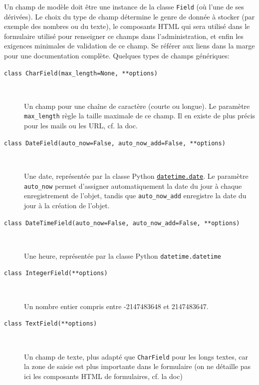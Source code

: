 \documentclass[a4paper, 10pt]{article}
\begin{document}
Un champ  de modèle doit être une instance de la classe \texttt{Field} (où l'une de ses dérivées). Le choix du type de champ détermine le genre de donnée à stocker (par exemple des nombres ou du texte), le composants HTML qui sera utilisé dans le formulaire utilisé pour renseigner ce champs dans l'administration, et enfin les exigences minimales de validation de ce champ. Se référer aux liens dans la marge pour une documentation complète. Quelques types de champs génériques:
\begin{description}
    \item[\texttt{class CharField(max_length=None, **options)}]~

          Un champ pour une chaîne de caractère (courte ou longue). Le paramètre \texttt{max_length} règle la taille maximale de ce champ. Il en existe de plus précis pour les mails ou les URL, cf. la doc.

    \item[\texttt{class DateField(auto_now=False, auto_now_add=False, **options)}]~

          Une date, représentée par la classe Python \hyperref[datetime]{\texttt{datetime.date}}. Le paramètre \texttt{auto_now} permet d'assigner automatiquement la date du jour à chaque enregistrement de l'objet, tandis que \texttt{auto_now_add} enregistre la date du jour à la création de l'objet.

    \item[\texttt{class DateTimeField(auto_now=False, auto_now_add=False, **options)}]~

          Une heure, représentée par la classe Python \texttt{datetime.datetime}

    \item[\texttt{class IntegerField(**options)}]~

          Un nombre entier compris entre -2147483648 et 2147483647.

    \item[\texttt{class TextField(**options)}]~

          Un champ de texte, plus adapté que \texttt{CharField} pour les longs textes, car la zone de saisie est plus importante dans le formulaire (on ne détaille pas ici les composants HTML de formulaires, cf. la doc)
\end{description}
\end{document}
